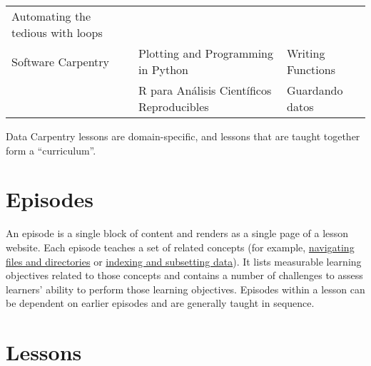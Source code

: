\documentclass[
]{book}
\begin{document}
\begin{longtable}[]{@{}lll@{}}
\begin{minipage}[t]{0.24\columnwidth}
Automating the tedious with loops\strut
\end{minipage}\tabularnewline
\begin{minipage}[t]{0.47\columnwidth}\raggedright
Software Carpentry\strut
\end{minipage} & \begin{minipage}[t]{0.20\columnwidth}\raggedright
Plotting and Programming in Python\strut
\end{minipage} & \begin{minipage}[t]{0.24\columnwidth}\raggedright
Writing Functions\strut
\end{minipage}\tabularnewline
\begin{minipage}[t]{0.47\columnwidth}\raggedright
\strut
\end{minipage} & \begin{minipage}[t]{0.20\columnwidth}\raggedright
R para Análisis Científicos Reproducibles\strut
\end{minipage} & \begin{minipage}[t]{0.24\columnwidth}\raggedright
Guardando datos\strut
\end{minipage}\tabularnewline
\bottomrule
\end{longtable}

Data Carpentry lessons are domain-specific, and lessons that are taught together form a ``curriculum''.

\hypertarget{episodes}{%
\section{Episodes}\label{episodes}}

An episode is a single block of content and renders as a single page of a lesson website.
Each episode teaches a set of related concepts (for example,
\href{http://swcarpentry.github.io/shell-novice/02-filedir/index.html}{navigating files and directories}
or \href{https://datacarpentry.org/python-ecology-lesson/03-index-slice-subset/index.html}{indexing and subsetting data}).
It lists measurable learning objectives related to those concepts
and contains a number of challenges to assess
learners' ability to perform those learning objectives. Episodes within a lesson can be
dependent on earlier episodes and are generally taught in sequence.

\hypertarget{lessons}{%
\section{Lessons}\label{lessons}}
\end{document}
